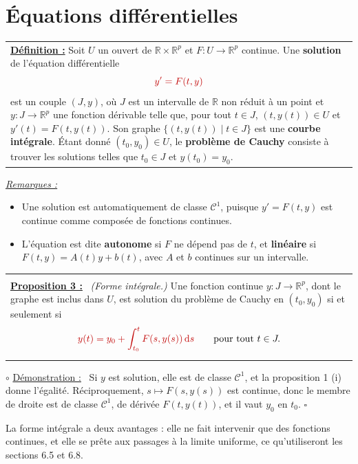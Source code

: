 \documentclass[a4paper,twoside]{report}
\makeatletter
\newcommand{\mot}[1]{\textcolor{rougecours}{\textbf{#1}}}
\newcommand{\rmath}[1]{\textcolor{rougecours}{#1}}
\newenvironment{cadre}%
 {\par\vspace{2mm}\noindent\begin{tabular}{|@{\hspace{4mm}}p{0.93\textwidth}@{\hspace{4mm}}|}
  \hline \\[-2mm]}%
 {\\[2mm] \hline \end{tabular}\par\vspace{3mm}}
\newcommand{\propo}[1]{\textbf{\underline{Proposition #1 :}}~}
\newenvironment{demo}%
 {\par\needspace{4\baselineskip}\vspace{1mm}\noindent$\circ$ \underline{Démonstration :}~\setlength{\parskip}{3pt plus 1pt}}%
 {\hfill$\square$\par\vspace{2mm}}
\newenvironment{remarques}%
 {\par\needspace{6\baselineskip}\vspace{1mm}\begin{list}{}{\leftmargin=1cm \rightmargin=0.5cm}\item[]%
  \textit{\underline{Remarques :}}%
  \begin{itemize}[label=$\bullet$,leftmargin=0.45cm,topsep=3pt,itemsep=4pt]}%
 {\end{itemize}\end{list}\vspace{1mm}}
\newcommand{\R}{\mathbb{R}}
\newcommand{\dd}{\mathrm{d}}                      %
\newcommand{\Cc}{\mathcal{C}}                     %
\makeatother
\begin{document}
\section[Équations différentielles]{Équations différentielles}

\begin{center}
\begin{tabularx}{15cm}{||X}
\noindent \textbf{\underline{Définition :}} Soit $U$ un ouvert de $\R \times \R^{p}$ et $F : U \to \R^{p}$ continue. Une \mot{solution} de l'équation différentielle
\[ \rmath{y' = F(t, y)} \]
est un couple $(J, y)$, où $J$ est un intervalle de $\R$ non réduit à un point et $y : J \to \R^{p}$ une fonction dérivable telle que, pour tout $t \in J$, $(t, y(t)) \in U$ et $y'(t) = F(t, y(t))$. Son graphe $\{(t, y(t)) \mid t \in J\}$ est une \mot{courbe intégrale}. Étant donné $(t_{0}, y_{0}) \in U$, le \mot{problème de Cauchy} consiste à trouver les solutions telles que $t_{0} \in J$ et $y(t_{0}) = y_{0}$.
\end{tabularx}
\end{center}

\begin{remarques}
  \item Une solution est automatiquement de classe $\Cc^{1}$, puisque $y' = F(t, y)$ est continue comme composée de fonctions continues.
  \item L'équation est dite \mot{autonome} si $F$ ne dépend pas de $t$, et \mot{linéaire} si $F(t, y) = A(t)y + b(t)$, avec $A$ et $b$ continues sur un intervalle.
\end{remarques}

\begin{cadre}
\propo{3} \emph{(Forme intégrale.)} Une fonction continue $y : J \to \R^{p}$, dont le graphe est inclus dans $U$, est solution du problème de Cauchy en $(t_{0}, y_{0})$ si et seulement si
\[ \rmath{y(t) = y_{0} + \int_{t_{0}}^{t} F(s, y(s))\,\dd s} \qquad \text{pour tout } t \in J. \]
\end{cadre}

\begin{demo}
Si $y$ est solution, elle est de classe $\Cc^{1}$, et la proposition 1 (i) donne l'égalité. Réciproquement, $s \mapsto F(s, y(s))$ est continue, donc le membre de droite est de classe $\Cc^{1}$, de dérivée $F(t, y(t))$, et il vaut $y_{0}$ en $t_{0}$.
\end{demo}

\noindent La forme intégrale a deux avantages : elle ne fait intervenir que des fonctions continues, et elle se prête aux passages à la limite uniforme, ce qu'utiliseront les sections 6.5 et 6.8.
\end{document}
